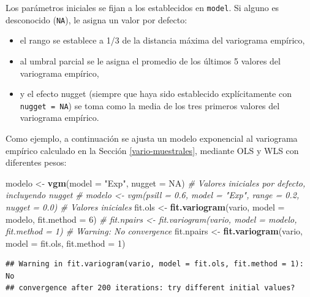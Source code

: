 \documentclass[
]{book}
\newenvironment{Shaded}{\begin{snugshade}}{\end{snugshade}}
\newcommand{\AttributeTok}[1]{\textcolor[rgb]{0.13,0.29,0.53}{#1}}
\newcommand{\CommentTok}[1]{\textcolor[rgb]{0.56,0.35,0.01}{\textit{#1}}}
\newcommand{\ConstantTok}[1]{\textcolor[rgb]{0.56,0.35,0.01}{#1}}
\newcommand{\DecValTok}[1]{\textcolor[rgb]{0.00,0.00,0.81}{#1}}
\newcommand{\FunctionTok}[1]{\textcolor[rgb]{0.13,0.29,0.53}{\textbf{#1}}}
\newcommand{\NormalTok}[1]{#1}
\newcommand{\OtherTok}[1]{\textcolor[rgb]{0.56,0.35,0.01}{#1}}
\newcommand{\StringTok}[1]{\textcolor[rgb]{0.31,0.60,0.02}{#1}}
\providecommand{\tightlist}{%
  \setlength{\itemsep}{0pt}\setlength{\parskip}{0pt}}
\theoremstyle{break}
\theoremstyle{definition}
\theoremstyle{definition}
\theoremstyle{definition}
\theoremstyle{definition}
\theoremstyle{remark}
\begin{document}
Los parámetros iniciales se fijan a los establecidos en \texttt{model}. Si alguno es desconocido (\texttt{NA}), le asigna un valor por defecto:

\begin{itemize}
\tightlist
\item
  el rango se establece a 1/3 de la distancia máxima del variograma empírico,
\item
  al umbral parcial se le asigna el promedio de los últimos 5 valores del variograma empírico,
\item
  y el efecto nugget (siempre que haya sido establecido explícitamente con \texttt{nugget\ =\ NA}) se toma como la media de los tres primeros valores del variograma empírico.
\end{itemize}

Como ejemplo, a continuación se ajusta un modelo exponencial al variograma empírico calculado en la Sección \ref{vario-muestrales}, mediante OLS y WLS con diferentes pesos:

\begin{Shaded}
\begin{Highlighting}[]
\NormalTok{modelo }\OtherTok{\textless{}{-}} \FunctionTok{vgm}\NormalTok{(}\AttributeTok{model =} \StringTok{"Exp"}\NormalTok{, }\AttributeTok{nugget =} \ConstantTok{NA}\NormalTok{) }\CommentTok{\# Valores iniciales por defecto, incluyendo nugget}
\CommentTok{\# modelo \textless{}{-} vgm(psill = 0.6, model = "Exp", range = 0.2, nugget = 0.0) \# Valores iniciales}
\NormalTok{fit.ols }\OtherTok{\textless{}{-}} \FunctionTok{fit.variogram}\NormalTok{(vario, }\AttributeTok{model =}\NormalTok{ modelo, }\AttributeTok{fit.method =} \DecValTok{6}\NormalTok{)}
\CommentTok{\# fit.npairs \textless{}{-} fit.variogram(vario, model = modelo, fit.method = 1) \# Warning: No convergence}
\NormalTok{fit.npairs }\OtherTok{\textless{}{-}} \FunctionTok{fit.variogram}\NormalTok{(vario, }\AttributeTok{model =}\NormalTok{ fit.ols, }\AttributeTok{fit.method =} \DecValTok{1}\NormalTok{)}
\end{Highlighting}
\end{Shaded}

\begin{verbatim}
## Warning in fit.variogram(vario, model = fit.ols, fit.method = 1): No
## convergence after 200 iterations: try different initial values?
\end{verbatim}
\end{document}
